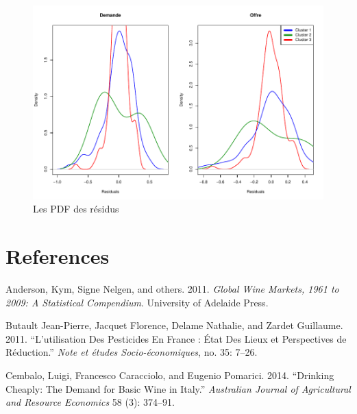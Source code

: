 \documentclass[11pt,]{article}
\begin{document}
\FloatBarrier

\FloatBarrier

\begin{figure}[!htbp]

{\centering \includegraphics{note2pres_files/figure-latex/unnamed-chunk-103-1} 

}

\caption{Les PDF des résidus}\label{fig:unnamed-chunk-103}
\end{figure}

\FloatBarrier

\newpage

\hypertarget{references}{%
\section*{References}\label{references}}

\hypertarget{refs}{}
\leavevmode\hypertarget{ref-anderson2011global}{}%
Anderson, Kym, Signe Nelgen, and others. 2011. \emph{Global Wine
Markets, 1961 to 2009: A Statistical Compendium}. University of Adelaide
Press.

\leavevmode\hypertarget{ref-Butault2011}{}%
Butault Jean-Pierre, Jacquet Florence, Delame Nathalie, and Zardet
Guillaume. 2011. ``L'utilisation Des Pesticides En France : État Des
Lieux et Perspectives de Réduction.'' \emph{Note et études
Socio-économiques}, no. 35: 7--26.

\leavevmode\hypertarget{ref-cembalo2014}{}%
Cembalo, Luigi, Francesco Caracciolo, and Eugenio Pomarici. 2014.
``Drinking Cheaply: The Demand for Basic Wine in Italy.''
\emph{Australian Journal of Agricultural and Resource Economics} 58 (3):
374--91.
\end{document}
